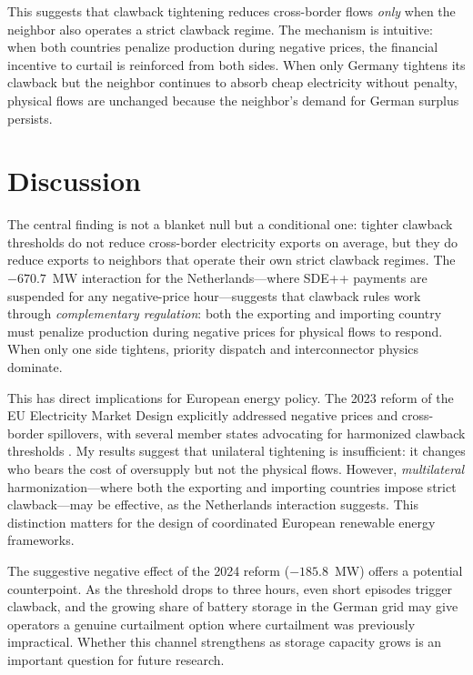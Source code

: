 \documentclass[12pt]{article}
\begin{document}
This suggests that clawback tightening reduces cross-border flows \textit{only} when the neighbor also operates a strict clawback regime. The mechanism is intuitive: when both countries penalize production during negative prices, the financial incentive to curtail is reinforced from both sides. When only Germany tightens its clawback but the neighbor continues to absorb cheap electricity without penalty, physical flows are unchanged because the neighbor's demand for German surplus persists.

\section{Discussion}
\label{sec:discussion}

The central finding is not a blanket null but a conditional one: tighter clawback thresholds do not reduce cross-border electricity exports on average, but they do reduce exports to neighbors that operate their own strict clawback regimes. The $-670.7$~MW interaction for the Netherlands---where SDE++ payments are suspended for any negative-price hour---suggests that clawback rules work through \textit{complementary regulation}: both the exporting and importing country must penalize production during negative prices for physical flows to respond. When only one side tightens, priority dispatch and interconnector physics dominate.

This has direct implications for European energy policy. The 2023 reform of the EU Electricity Market Design explicitly addressed negative prices and cross-border spillovers, with several member states advocating for harmonized clawback thresholds \citep{acer2020negative}. My results suggest that unilateral tightening is insufficient: it changes who bears the cost of oversupply but not the physical flows. However, \textit{multilateral} harmonization---where both the exporting and importing countries impose strict clawback---may be effective, as the Netherlands interaction suggests. This distinction matters for the design of coordinated European renewable energy frameworks.

The suggestive negative effect of the 2024 reform ($-185.8$~MW) offers a potential counterpoint. As the threshold drops to three hours, even short episodes trigger clawback, and the growing share of battery storage in the German grid may give operators a genuine curtailment option where curtailment was previously impractical. Whether this channel strengthens as storage capacity grows is an important question for future research.
\end{document}

